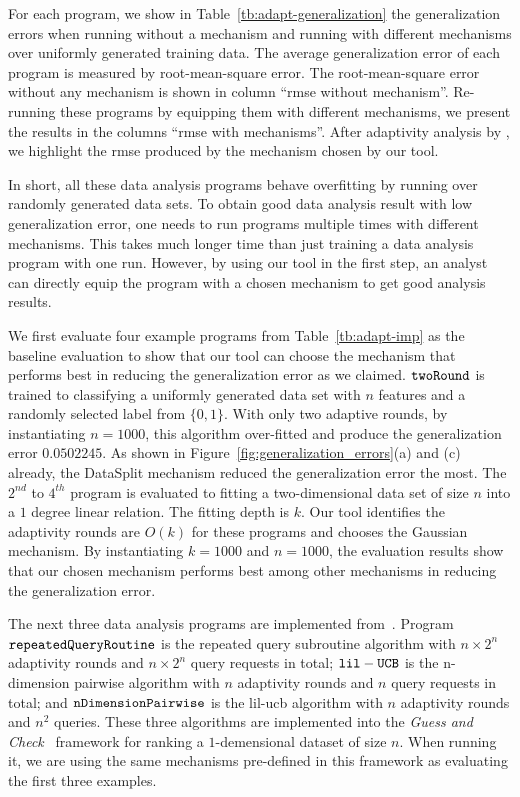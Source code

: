 For each program, we show in Table~\ref{tb:adapt-generalization} the generalization errors when running without a mechanism
and running with different mechanisms over uniformly generated training data.
The average generalization error of each program is measured by root-mean-square error.
The root-mean-square error without any mechanism is shown in column ``rmse without mechanism''.
Re-running these programs by equipping them with different mechanisms, we present the results
in the columns ``rmse with mechanisms''.
After adaptivity analysis by {\THESYSTEM}, we highlight the rmse produced by the mechanism chosen by our tool.

In short, all these data analysis programs behave overfitting by running over randomly generated data sets. 
To obtain good data analysis result with low generalization error,
one needs to run programs multiple times with different mechanisms.
This takes much longer time than just training a data analysis program with one run.
However, by using our tool in the first step, an analyst can directly equip the program with a chosen mechanism to get good
analysis results.


We first evaluate four example programs from Table~\ref{tb:adapt-imp} as the baseline evaluation to show that our tool can choose the mechanism that performs best in reducing the generalization error as we claimed.
$\mathtt{twoRound}$ is trained to classifying a uniformly generated data set with $n$ features and a randomly selected label from $\{0, 1\}$. 
With only two adaptive rounds, by instantiating $n = 1000$, this algorithm over-fitted and produce the generalization error 
$0.0502245$. As shown in Figure~\ref{fig:generalization_errors}(a) and (c) already,
the DataSplit mechanism reduced the generalization error the most.
The $2^{nd}$ to $4^{th}$ program is evaluated to fitting a two-dimensional data set of size $n$ into a $1$ degree linear relation.
The fitting depth is $k$.
Our tool identifies the adaptivity rounds are $O(k)$ for these programs and chooses the Gaussian mechanism.
By instantiating $k = 1000$ and $n = 1000$, the evaluation results show that our chosen mechanism performs best among other mechanisms in reducing the generalization error.

The next three data analysis programs are implemented from~\cite{Jamieson2015TheAO}.
Program $\mathtt{repeatedQueryRoutine}$ is the
repeated query subroutine algorithm with $n\times 2^n$ adaptivity rounds and $n\times 2^n$ query requests in total;
$\mathtt{lil-UCB}$ is the n-dimension pairwise algorithm with $n$ adaptivity rounds and $n$ query requests in total;
and $\mathtt{nDimensionPairwise}$ is the lil-ucb algorithm with $n$ adaptivity rounds and $n^2$ queries.
These three algorithms are implemented into the \emph{Guess and Check}~\cite{RogersRSSTW20} framework for ranking
a $1$-demensional dataset of size $n$.
When running it, we are using the same mechanisms pre-defined in this framework as evaluating the first three examples.

